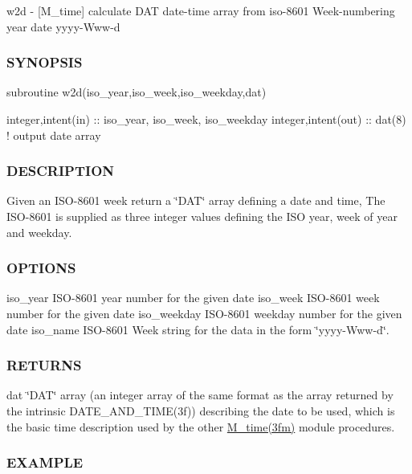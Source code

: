 \begin{DoxyVerb}
w2d -\/ \mbox{[}M\+\_\+time\mbox{]} calculate D\+AT date-\/time array from iso-\/8601 Week-\/numbering year date yyyy-\/\+Www-\/d 

\subsubsection*{S\+Y\+N\+O\+P\+S\+IS}

\begin{DoxyVerb}subroutine w2d(iso_year,iso_week,iso_weekday,dat)

 integer,intent(in)      :: iso_year, iso_week, iso_weekday
 integer,intent(out)     :: dat(8)     ! output date array
\end{DoxyVerb}


\subsubsection*{D\+E\+S\+C\+R\+I\+P\+T\+I\+ON}

Given an I\+S\+O-\/8601 week return a \char`\"{}\+D\+A\+T\char`\"{} array defining a date and time, The I\+S\+O-\/8601 is supplied as three integer values defining the I\+SO year, week of year and weekday.

\subsubsection*{O\+P\+T\+I\+O\+NS}

iso\+\_\+year I\+S\+O-\/8601 year number for the given date iso\+\_\+week I\+S\+O-\/8601 week number for the given date iso\+\_\+weekday I\+S\+O-\/8601 weekday number for the given date iso\+\_\+name I\+S\+O-\/8601 Week string for the data in the form \char`\"{}yyyy-\/\+Www-\/d\char`\"{}.

\subsubsection*{R\+E\+T\+U\+R\+NS}

dat \char`\"{}\+D\+A\+T\char`\"{} array (an integer array of the same format as the array returned by the intrinsic D\+A\+T\+E\+\_\+\+A\+N\+D\+\_\+\+T\+I\+M\+E(3f)) describing the date to be used, which is the basic time description used by the other \hyperlink{M__time_83_8txt_a9591ef7ca68b7656bfd5560ed8d81293}{M\+\_\+time(3fm)} module procedures.

\subsubsection*{E\+X\+A\+M\+P\+LE}


\end{DoxyVerb}
